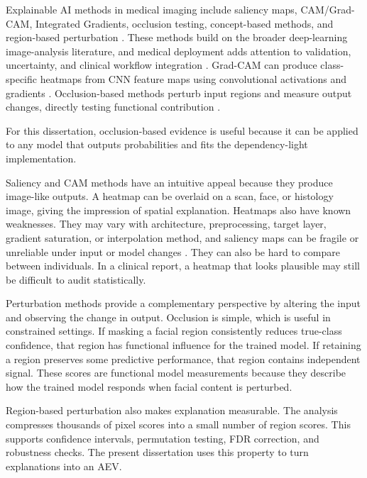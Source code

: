 Explainable AI methods in medical imaging include saliency maps, CAM/Grad-CAM, Integrated Gradients, occlusion testing, concept-based methods, and region-based perturbation      . These methods build on the broader deep-learning image-analysis literature, and medical deployment adds attention to validation, uncertainty, and clinical workflow integration     . Grad-CAM can produce class-specific heatmaps from CNN feature maps using convolutional activations and gradients  . Occlusion-based methods perturb input regions and measure output changes, directly testing functional contribution  .


For this dissertation, occlusion-based evidence is useful because it can be applied to any model that outputs probabilities and fits the dependency-light implementation.


Saliency and CAM methods have an intuitive appeal because they produce image-like outputs. A heatmap can be overlaid on a scan, face, or histology image, giving the impression of spatial explanation. Heatmaps also have known weaknesses. They may vary with architecture, preprocessing, target layer, gradient saturation, or interpolation method, and saliency maps can be fragile or unreliable under input or model changes   . They can also be hard to compare between individuals. In a clinical report, a heatmap that looks plausible may still be difficult to audit statistically.


Perturbation methods provide a complementary perspective by altering the input and observing the change in output. Occlusion is simple, which is useful in constrained settings. If masking a facial region consistently reduces true-class confidence, that region has functional influence for the trained model. If retaining a region preserves some predictive performance, that region contains independent signal. These scores are functional model measurements because they describe how the trained model responds when facial content is perturbed.


Region-based perturbation also makes explanation measurable. The analysis compresses thousands of pixel scores into a small number of region scores. This supports confidence intervals, permutation testing, FDR correction, and robustness checks. The present dissertation uses this property to turn explanations into an AEV.



